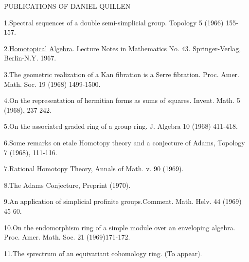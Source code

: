\begin{center}
PUBLICATIONS OF DANIEL QUILLEN
\end{center}

1.\quad Spectral sequences of a double semi-simplicial
group. Topology 5 (1966) 155-157.

2.\quad \uline{Homotopical} \uline{Algebra}. Lecture Notes in Mathematics
No. 43. Springer-Verlag, Berlin-N.Y. 1967.

3.\quad The geometric realization of a Kan fibration is a
Serre fibration. Proc. Amer. Math. Soc. 19 (1968)
1499-1500.

4.\quad On the representation of hermitian forms as sums
of squares. Invent. Math. 5 (1968), 237-242.

5.\quad On the associated graded ring of a group ring.
J. Algebra 10 (1968) 411-418.

6.\quad Some remarks on etale Homotopy theory and a conjecture
of Adams, Topology 7 (1968), 111-116.

7.\quad Rational Homotopy Theory, Annals of Math. v. 90 (1969).

8.\quad The Adams Conjecture, Preprint (1970).

9.\quad An application of simplicial profinite groups.Comment.
Math. Helv. 44 (1969) 45-60.

10.\quad On the endomorphism ring of a simple module over an
enveloping algebra. Proc. Amer. Math. Soc. 21 (1969)171-172.

11.\quad The sprectrum of an equivariant cohomology ring. (To
appear).

